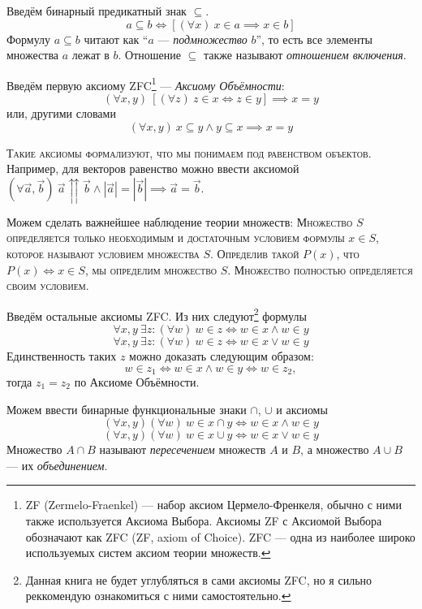 Введём бинарный предикатный знак $\subseteq$.
\[
  a\subseteq b\iff [(\forall x)~x\in a\implies x\in b]
\]
Формулу ${a\subseteq b}$ читают как ``$a$ --- {\it подмножество} $b$'', то есть все
элементы множества $a$ лежат в $b$. Отношение $\subseteq$ также называют
{\it отношением включения}.

Введём первую аксиому ZFC\footnote{
  ZF (Zermelo-Fraenkel) --- набор аксиом
  Цермело-Френкеля, обычно с ними также
  используется Аксиома Выбора. Аксиомы ZF с Аксиомой Выбора
  обозначают как ZFC (ZF, axiom of Choice).
  ZFC --- одна из наиболее широко используемых систем аксиом теории множеств.
} --- {\it Аксиому Объёмности}:
\begin{equation}\label{eq:ax_ext_1}
  (\forall x,y)~[(\forall z)~z\in x\iff z\in y]\implies x=y
\end{equation}
или, другими словами
\begin{equation}\label{eq:ax_ext_2}
  (\forall x,y)~x\subseteq y\land y\subseteq x\implies x=y
\end{equation}

\textsc{Такие аксиомы формализуют, что мы понимаем под равенством объектов.}
Например, для векторов равенство можно ввести аксиомой
$(\forall \vec{a},\vec{b})~
  \vec{a}\upuparrows\vec{b}\land|\vec{a}|=|\vec{b}|
  \implies \vec{a}=\vec{b}$.

Можем сделать важнейшее наблюдение теории множеств: \textsc{Множество $S$
  определяется только необходимым и достаточным условием формулы $x\in S$,
  которое называют условием множества $S$.
  Определив такой $P(x)$, что $P(x)\iff x\in S$, мы определим множество $S$.
  Множество полностью определяется своим условием.}

Введём остальные аксиомы ZFC. Из них следуют\footnote{
  Данная книга не будет углубляться в сами аксиомы ZFC, но я сильно реккомендую
  ознакомиться с ними самостоятельно.}
формулы
\[
  \forall x,y~\exists z:(\forall w)~w\in z\iff w\in x\land w\in y
\]
\[
  \forall x,y~\exists z:(\forall w)~w\in z\iff w\in x\lor w\in y
\]
Единственность таких $z$ можно доказать следующим образом:
\[
  w\in z_1\iff w\in x\land w\in y\iff w\in z_2,
\]
тогда $z_1=z_2$ по Аксиоме Объёмности.

Можем ввести бинарные функциональные знаки $\cap$, $\cup$ и аксиомы
\[
  (\forall x,y)(\forall w)~w\in x\cap y\iff w\in x\land w\in y
\]
\[
  (\forall x,y)(\forall w)~w\in x\cup y\iff w\in x\lor w\in y
\]
Множество $A\cap B$ называют {\it пересечением} множеств $A$ и $B$,
а множество $A\cup B$ --- их {\it объединением}.

